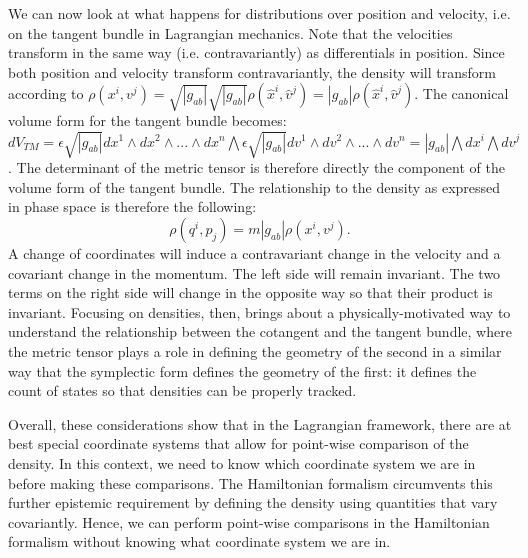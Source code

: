 \documentclass[letterpaper]{article}
\begin{document}
We can now look at what happens for distributions over position and velocity, i.e. on the tangent bundle in Lagrangian mechanics. Note that the velocities transform in the same way (i.e. contravariantly) as differentials in position. Since both position and velocity transform contravariantly, the density will transform according to $\rho(x^i, v^j) = \sqrt{|g_{ab}|} \sqrt{|g_{ab}|} \rho(\hat{x}^i, \hat{v}^j) = |g_{ab}| \rho(\hat{x}^i, \hat{v}^j)$. The canonical volume form for the tangent bundle becomes: $dV_{TM} = \epsilon \sqrt{|g_{ab}|} dx^1 \wedge dx^2 \wedge ... \wedge dx^n \bigwedge \epsilon \sqrt{|g_{ab}|} dv^1 \wedge dv^2 \wedge ... \wedge dv^n = |g_{ab}| \bigwedge dx^i \bigwedge dv^j$. The determinant of the metric tensor is therefore directly the component of the volume form of the tangent bundle. The relationship to the density as expressed in phase space is therefore the following:
\begin{equation}
	\rho(q^i, p_j) = m |g_{ab}| \rho(x^i, v^j).
\end{equation}
A change of coordinates will induce a contravariant change in the velocity and a covariant change in the momentum. The left side will remain invariant. The two terms on the right side will change in the opposite way so that their product is invariant. Focusing on densities, then, brings about a physically-motivated way to understand the relationship between the cotangent and the tangent bundle, where the metric tensor plays a role in defining the geometry of the second in a similar way that the symplectic form defines the geometry of the first: it defines the count of states so that densities can be properly tracked.


Overall, these considerations show that in the Lagrangian framework, there are at best special coordinate systems that allow for point-wise comparison of the density. In this context, we need to know which coordinate system we are in before making these comparisons. The Hamiltonian formalism circumvents this further epistemic requirement by defining the density using quantities that vary covariantly. Hence, we can perform point-wise comparisons in the Hamiltonian formalism without knowing what coordinate system we are in.
\end{document}
